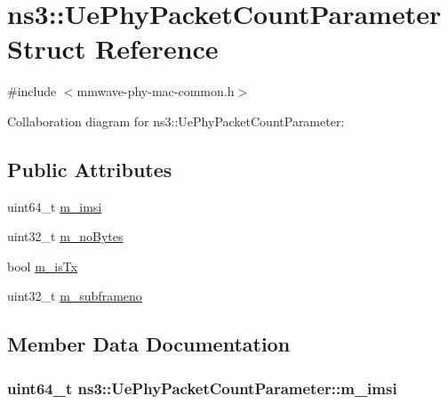 \hypertarget{structns3_1_1UePhyPacketCountParameter}{}\section{ns3\+:\+:Ue\+Phy\+Packet\+Count\+Parameter Struct Reference}
\label{structns3_1_1UePhyPacketCountParameter}


{\ttfamily \#include $<$mmwave-\/phy-\/mac-\/common.\+h$>$}



Collaboration diagram for ns3\+:\+:Ue\+Phy\+Packet\+Count\+Parameter\+:
\subsection*{Public Attributes}
\begin{DoxyCompactItemize}
\item 
uint64\+\_\+t \hyperlink{structns3_1_1UePhyPacketCountParameter_aefc8639d9427eae9f0b3180c0b87a3ba}{m\+\_\+imsi}
\item 
uint32\+\_\+t \hyperlink{structns3_1_1UePhyPacketCountParameter_a71f38f5f000dab64cb0c8af6b14a9825}{m\+\_\+no\+Bytes}
\item 
bool \hyperlink{structns3_1_1UePhyPacketCountParameter_a5edb3f8fb3d2115166609eecff05497f}{m\+\_\+is\+Tx}
\item 
uint32\+\_\+t \hyperlink{structns3_1_1UePhyPacketCountParameter_a0a7375022f0103933fd38ccecb46bf3d}{m\+\_\+subframeno}
\end{DoxyCompactItemize}


\subsection{Member Data Documentation}
\subsubsection[{\texorpdfstring{m\+\_\+imsi}{m_imsi}}]{\setlength{\rightskip}{0pt plus 5cm}uint64\+\_\+t ns3\+::\+Ue\+Phy\+Packet\+Count\+Parameter\+::m\+\_\+imsi}\hypertarget{structns3_1_1UePhyPacketCountParameter_aefc8639d9427eae9f0b3180c0b87a3ba}{}\label{structns3_1_1UePhyPacketCountParameter_aefc8639d9427eae9f0b3180c0b87a3ba}
